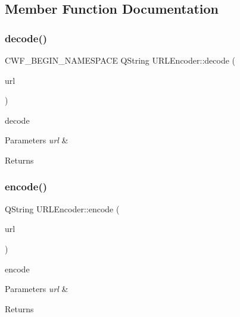 \subsection{Member Function Documentation}
\mbox{\label{class_u_r_l_encoder_a109e17d4d839a70b56125c239918b639}} 
\subsubsection{\texorpdfstring{decode()}{decode()}}
{\footnotesize\ttfamily C\+W\+F\+\_\+\+B\+E\+G\+I\+N\+\_\+\+N\+A\+M\+E\+S\+P\+A\+CE Q\+String U\+R\+L\+Encoder\+::decode (\begin{DoxyParamCaption}\item[{const Q\+Byte\+Array \&}]{url }\end{DoxyParamCaption})\hspace{0.3cm}{\ttfamily [static]}}



decode 


\begin{DoxyParams}{Parameters}
{\em url} & \\
\hline
\end{DoxyParams}
\begin{DoxyReturn}{Returns}

\end{DoxyReturn}
\mbox{\label{class_u_r_l_encoder_ad30f9c19d4629f268d54983d891db714}} 
\subsubsection{\texorpdfstring{encode()}{encode()}}
{\footnotesize\ttfamily Q\+String U\+R\+L\+Encoder\+::encode (\begin{DoxyParamCaption}\item[{const Q\+Byte\+Array \&}]{url }\end{DoxyParamCaption})\hspace{0.3cm}{\ttfamily [static]}}



encode 


\begin{DoxyParams}{Parameters}
{\em url} & \\
\hline
\end{DoxyParams}
\begin{DoxyReturn}{Returns}

\end{DoxyReturn}
\mbox{\label{class_u_r_l_encoder_a8780e1a9f6186726c83776a5c3543b6e}} 
